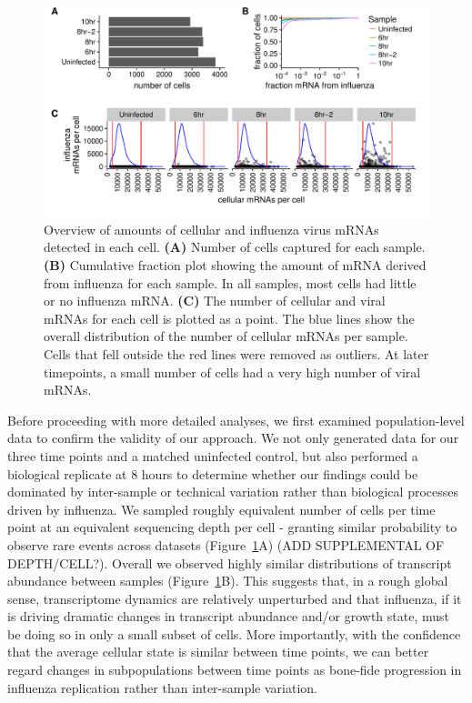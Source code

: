 \documentclass[9pt,lineno]{elife}
\begin{document}
\begin{figure}
\includegraphics[width=\linewidth]{figures/p_cell_mRNA_summary.pdf}
\caption{\label{fig:cells}
Overview of amounts of cellular and influenza virus mRNAs detected in each cell.
{\bf (A)} 
Number of cells captured for each sample.
{\bf (B)} 
Cumulative fraction plot showing the amount of mRNA derived from influenza for each sample.
In all samples, most cells had little or no influenza mRNA.
{\bf (C)} 
The number of cellular and viral mRNAs for each cell is plotted as a point.
The blue lines show the overall distribution of the number of cellular mRNAs per sample.
Cells that fell outside the red lines were removed as outliers.
At later timepoints, a small number of cells had a very high number of viral mRNAs.
}
\end{figure}

Before proceeding with more detailed analyses, we first examined population-level data to confirm the validity of our approach. 
We not only generated data for our three time points and a matched uninfected control, but also performed a biological replicate at 8 hours to determine whether our findings could be dominated by inter-sample or technical variation rather than biological processes driven by influenza. 
We sampled roughly equivalent number of cells per time point at an equivalent sequencing depth per cell - granting similar probability to observe rare events across datasets (Figure~\ref{fig:cells}A) (ADD SUPPLEMENTAL OF DEPTH/CELL?). 
Overall we observed highly similar distributions of transcript abundance between samples (Figure~\ref{fig:cells}B). 
This suggests that, in a rough global sense, transcriptome dynamics are relatively unperturbed and that influenza, if it is driving dramatic changes in transcript abundance and/or growth state, must be doing so in only a small subset of cells. 
More importantly, with the confidence that the average cellular state is similar between time points, we can better regard changes in subpopulations between time points as bone-fide progression in influenza replication rather than inter-sample variation.
\end{document}
